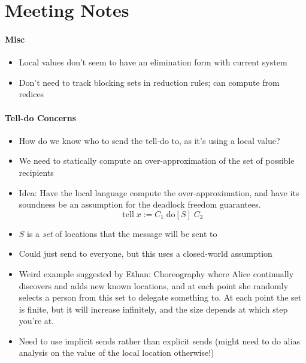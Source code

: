\documentclass{article}
\theoremstyle{definition}
\begin{document}
\section{Meeting Notes}
\paragraph{Misc}
\begin{itemize}
	\item Local values don't seem to have an elimination form with current system
	\item Don't need to track blocking sets in reduction rules; can compute from redices
\end{itemize}

\paragraph{Tell-do Concerns}
\begin{itemize}
	\item How do we know who to send the tell-do to, as it's using a local value?
	\item We need to statically compute an over-approximation of the set of possible recipients
	\item Idea: Have the local language compute the over-approximation, and have its soundness be an assumption for the deadlock freedom guarantees.
	\[
	\text{tell}\; x := C_1 \;\text{do}[S]\; C_2
	\]
	\item $S$ is a \emph{set} of locations that the message will be sent to
	\item Could just send to everyone, but this uses a closed-world assumption
	\item Weird example suggested by Ethan: Choreography where Alice continually discovers and adds new known locations, and at each point she randomly selects a person from this set to delegate something to. At each point the set is finite, but it will increase infinitely, and the size depends at which step you're at.
	\item Need to use implicit sends rather than explicit sends (might need to do alias analysis on the value of the local location otherwise!)
\end{itemize}
\end{document}

